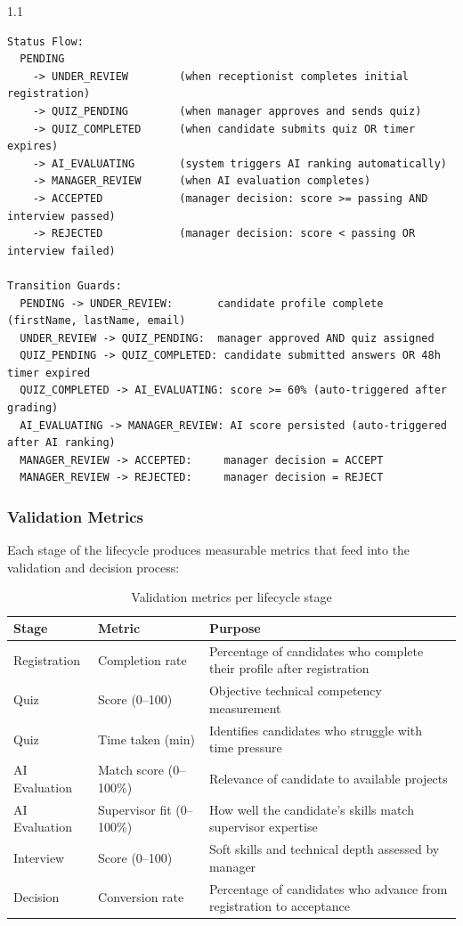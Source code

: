 \begin{spacing}{1.1}
\begin{verbatim}
Status Flow:
  PENDING
    -> UNDER_REVIEW        (when receptionist completes initial registration)
    -> QUIZ_PENDING        (when manager approves and sends quiz)
    -> QUIZ_COMPLETED      (when candidate submits quiz OR timer expires)
    -> AI_EVALUATING       (system triggers AI ranking automatically)
    -> MANAGER_REVIEW      (when AI evaluation completes)
    -> ACCEPTED            (manager decision: score >= passing AND interview passed)
    -> REJECTED            (manager decision: score < passing OR interview failed)

Transition Guards:
  PENDING -> UNDER_REVIEW:       candidate profile complete (firstName, lastName, email)
  UNDER_REVIEW -> QUIZ_PENDING:  manager approved AND quiz assigned
  QUIZ_PENDING -> QUIZ_COMPLETED: candidate submitted answers OR 48h timer expired
  QUIZ_COMPLETED -> AI_EVALUATING: score >= 60% (auto-triggered after grading)
  AI_EVALUATING -> MANAGER_REVIEW: AI score persisted (auto-triggered after AI ranking)
  MANAGER_REVIEW -> ACCEPTED:     manager decision = ACCEPT
  MANAGER_REVIEW -> REJECTED:     manager decision = REJECT
\end{verbatim}
\end{spacing}

\subsubsection{Validation Metrics}
Each stage of the lifecycle produces measurable metrics that feed into the validation and decision process:

\begin{table}[H]
\centering
\begin{tabular}{|p{3.5cm}|p{3.5cm}|p{5cm}|}
\hline
\rowcolor{gray!20}
\textbf{Stage} & \textbf{Metric} & \textbf{Purpose} \\
\hline
Registration & Completion rate & Percentage of candidates who complete their profile after registration \\
\hline
Quiz & Score (0--100) & Objective technical competency measurement \\
\hline
Quiz & Time taken (min) & Identifies candidates who struggle with time pressure \\
\hline
AI Evaluation & Match score (0--100\%) & Relevance of candidate to available projects \\
\hline
AI Evaluation & Supervisor fit (0--100\%) & How well the candidate's skills match supervisor expertise \\
\hline
Interview & Score (0--100) & Soft skills and technical depth assessed by manager \\
\hline
Decision & Conversion rate & Percentage of candidates who advance from registration to acceptance \\
\hline
\end{tabular}
\caption{Validation metrics per lifecycle stage}
\end{table}

